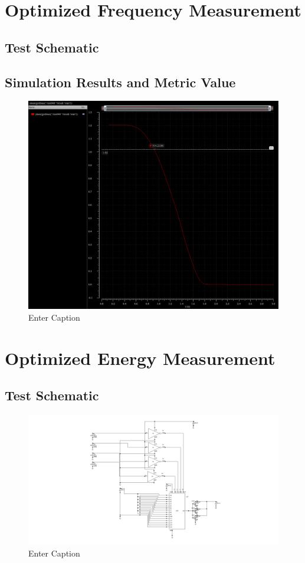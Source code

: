 \documentclass[12pt]{article}
\begin{document}
\newpage

\section{Optimized Frequency Measurement}
\subsection{Test Schematic}



\newpage

\subsection{Simulation Results and Metric Value}

\begin{figure}[H]
    \centering
    \includegraphics[width=0.5\linewidth]{writeup//figures/max_frequencies_optimized.png}
    \caption{Enter Caption}
\end{figure}



\newpage

\section{Optimized Energy Measurement}
\subsection{Test Schematic}

\begin{figure}[H]
    \centering
    \includegraphics[width=0.5\linewidth]{writeup//figures/updated_energy_opt_testchem.png}
    \caption{Enter Caption}
\end{figure}
\end{document}

